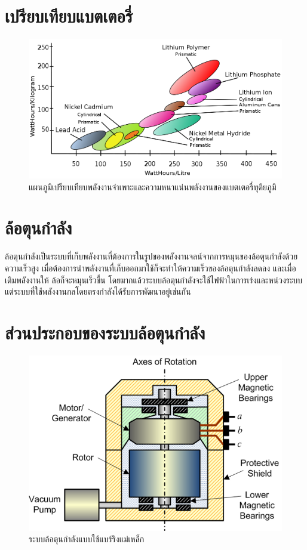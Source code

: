 \documentclass[a4paper,nobib,openany,10pt]{tufte-book}
\begin{document}
\section{เปรียบเทียบแบตเตอรี่}
\label{sec:org5f712ed}

\begin{figure}[htbp]
\centering
\includegraphics[width=.9\linewidth]{./pictures/battery-energy-density-comparison.png}
\caption{\label{fig: battery energy density comparison}แผนภูมิเปรียบเทียบพลังงานจำเพาะและความหนาแน่นพลังงานของแบตเตอรี่ทุติยภูมิ}
\end{figure}

\section{ล้อตุนกำลัง}
\label{sec:org486e4a7}

ล้อตุนกำลังเป็นระบบที่เก็บพลังงานที่ต้องการในรูปของพลังงานจลน์จากการหมุนของล้อตุนกำลังด้วยความเร็วสูง เมื่อต้องการนำพลังงานที่เก็บออกมาใช้ก็จะทำให้ความเร็วของล้อตุนกำลังลดลง และเมื่อเติมพลังงานให้ ล้อก็จะหมุนเร็วขึ้น โดยมากแล้วระบบล้อตุนกำลังจะใช้ไฟฟ้าในการเร่งและหน่วงระบบ แต่ระบบที่ใช้พลังงานกลโดยตรงกำลังได้รับการพัฒนาอยู่เช่นกัน

\section{ส่วนประกอบของระบบล้อตุนกำลัง}
\label{sec:orgb2b674d}

\begin{figure}[htbp]
\centering
\includegraphics[width=.9\linewidth]{./pictures/flywheel-components.png}
\caption{ระบบล้อตุนกำลังแบบใช้แบร์ริงแม่เหล็ก}
\end{figure}
\end{document}
